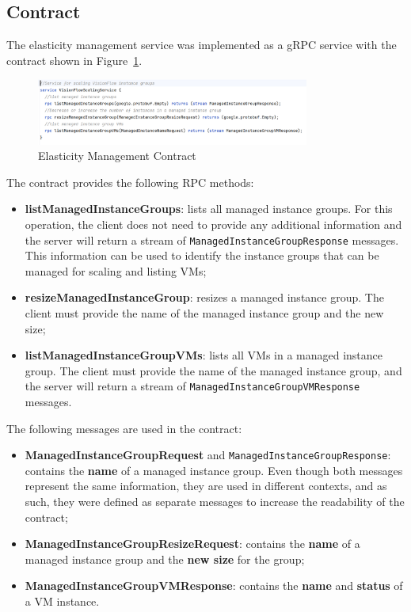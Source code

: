 \subsection{Contract}\label{subsec:elasticity-management-contract}

The elasticity management service was implemented as a gRPC service with the contract shown in Figure~\ref{fig:grpc-scaling-contract}.

\begin{figure}[!htb]
    \centering
    \includegraphics[width=0.8\textwidth]{../figures/grpc-scaling-contract}
    \caption{Elasticity Management Contract}
    \label{fig:grpc-scaling-contract}
\end{figure}

The contract provides the following RPC methods:

\begin{itemize}
    \item \textbf{listManagedInstanceGroups}: lists all managed instance groups.
    For this operation,
    the client does not need to provide any additional information
    and the server will return a stream of \texttt{ManagedInstanceGroupResponse} messages.
    This information can be used to identify the instance groups that can be managed for scaling and listing VMs;
    \item \textbf{resizeManagedInstanceGroup}: resizes a managed instance group.
    The client must provide the name of the managed instance group and the new size;
    \item \textbf{listManagedInstanceGroupVMs}: lists all VMs in a managed instance group.
    The client must provide the name of the managed instance group, and the server will return a stream of \texttt{ManagedInstanceGroupVMResponse} messages.
\end{itemize}

The following messages are used in the contract:

\begin{itemize}
    \item \textbf{ManagedInstanceGroupRequest} and \texttt{ManagedInstanceGroupResponse}:
    contains the \textbf{name} of a managed instance group.
    Even though both messages represent the same information, they are used in different contexts,
    and as such, they were defined as separate messages to increase the readability of the contract;
    \item \textbf{ManagedInstanceGroupResizeRequest}:
    contains the \textbf{name} of a managed instance group and the \textbf{new size} for the group;
    \item \textbf{ManagedInstanceGroupVMResponse}: contains the \textbf{name} and \textbf{status} of a VM instance.
\end{itemize}

